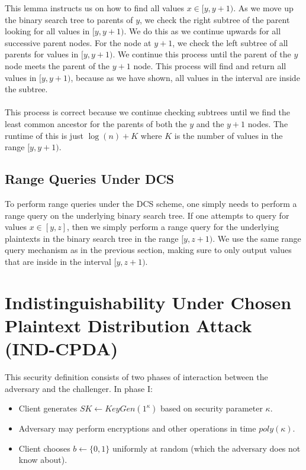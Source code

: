 \documentclass[12pt]{article}
\begin{document}
This lemma instructs us on how to find all values $x \in [y, y+1)$. As we move up the binary search tree to parents of $y$, we check the right subtree of the parent looking for all values in $[y, y+1)$. We do this as we continue upwards for all successive parent nodes. For the node at $y+1$, we check the left subtree of all parents for values in $[y, y+1)$. We continue this process until the parent of the $y$ node meets the parent of the $y+1$ node. This process will find and return all values in $[y, y+1)$, because as we have shown, all values in the interval are inside the subtree. \\ \\
This process is correct because we continue checking subtrees until we find the least common ancestor for the parents of both the $y$ and the $y+1$ nodes. The runtime of this is just $\log(n) + K$ where $K$ is the number of values in the range $[y, y+1)$.

  \subsection{Range Queries Under DCS}

  To perform range queries under the DCS scheme, one simply needs to perform a range query on the underlying binary search tree. If one attempts to query for values $x \in [y, z]$, then we simply perform a range query for the underlying plaintexts in the binary search tree in the range $[y, z+1)$. We use the same range query mechanism as in the previous section, making sure to only output values that are inside in the interval $[y, z+1)$.
\section{Indistinguishability Under Chosen Plaintext Distribution Attack (IND-CPDA)}

This security definition consists of two phases of interaction between the adversary and the challenger. In phase I:

\begin{itemize}
  \item Client generates $SK \leftarrow KeyGen(1^\kappa)$ based on security parameter $\kappa$.
  \item Adversary may perform encryptions and other operations in time $poly(\kappa)$.
  \item Client chooses $b \leftarrow \{0,1\}$ uniformly at random (which the adversary does not know about).
\end{itemize}
\end{document}
